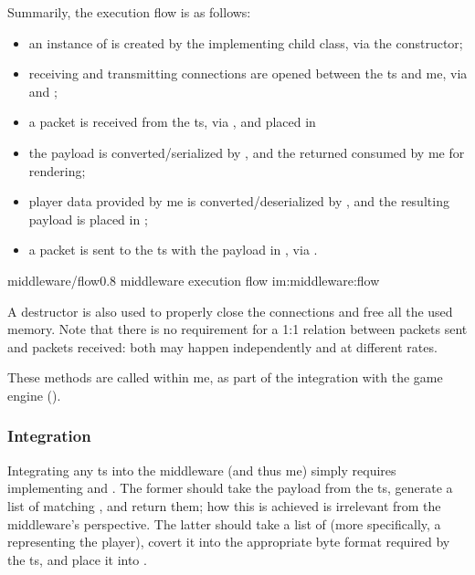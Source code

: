 Summarily, the execution flow is as follows:

\begin{itemize}
	\item an instance of  is created by the implementing child class, via the  constructor;
	\item receiving and transmitting connections are opened between the \gls{ts} and \gls{me}, via  and ;
	\item a \gls{packet} is received from the \gls{ts}, via , and placed in 
	\item the \gls{payload} is converted/serialized by , and the returned  consumed by \gls{me} for rendering;
	\item player data provided by \gls{me} is converted/deserialized by , and the resulting \gls{payload} is placed in ;
	\item a \gls{packet} is sent to the \gls{ts} with the \gls{payload} in , via .
\end{itemize}

\begin{image}
	{middleware/flow}{0.8}
	{\gls{middleware} execution flow}
	{im:middleware:flow}
	{}
\end{image}

A destructor is also used to properly close the connections and free all the used memory. Note that there is no requirement for a 1:1 relation between \glspl{packet} sent and \glspl{packet} received: both may happen independently and at different rates.

These methods are called within \gls{me}, as part of the integration with the game engine ().

\subsubsection{Integration}

Integrating any \gls{ts} into the \gls{middleware} (and thus \gls{me}) simply requires implementing  and . The former should take the \gls{payload} from the \gls{ts}, generate a list of matching , and return them; how this is achieved is irrelevant from the \gls{middleware}'s perspective. The latter should take a list of  (more specifically, a  representing the player), covert it into the appropriate byte format required by the \gls{ts}, and place it into .

